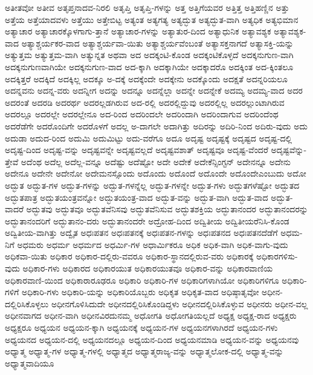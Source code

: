 {ಅತೀತವೋ
ಅತೀವ
ಅತೃಪ್ತನಾದವ-ನಿರಲಿ
ಅತೃಪ್ತಿ
ಅತೃಪ್ತಿ-ಗಳನ್ನು
ಅತ್ತ
ಅತ್ತಿಗೆಯವರ
ಅತ್ತಿತ್ತ
ಅತ್ತಿಹಣ್ಣಿನ
ಅತ್ತು
ಅತ್ತೆಯ
ಅತ್ತೆಯಾದವಳು
ಅತ್ತೆಯು
ಅತ್ತೇಬಿಟ್ಟ
ಅತ್ಯಂತ
ಅತ್ಯಗತ್ಯ
ಅತ್ಯದ್ಭುತ
ಅತ್ಯದ್ಭುತ-ವಾಗಿ
ಅತ್ಯಧಿಕ
ಅತ್ಯಭಿಮಾನ
ಅತ್ಯಾಚಾರ
ಅತ್ಯಾಚಾರಕ್ಕೊಳಗಾಗು-ತ್ತಾನೆ
ಅತ್ಯಾಚಾರ-ಗಳನ್ನು
ಅತ್ಯಾತುರ-ದಿಂದ
ಅತ್ಯಾಧುನಿಕ
ಅತ್ಯಾವಶ್ಯಕ
ಅತ್ಯಾವಶ್ಯಕ-ವಾದ
ಅತ್ಯಾಶ್ಚರ್ಯಕರ-ವಾದ
ಅತ್ಯಾಶ್ಚರ್ಯವಾ-ಯಿತು
ಅತ್ಯಾಶ್ಚರ್ಯವೆಂಬಂತೆ
ಅತ್ಯಾಸಕ್ತನಾಗದೆ
ಅತ್ಯಾಸಕ್ತಿ-ಯನ್ನು
ಅತ್ಯುತ್ತಮ
ಅತ್ಯುತ್ತಮ-ವಾಗಿ
ಅತ್ಯುನ್ನತ
ಅಥವಾ
ಅದ
ಅದಕ್ಕಂಟಿ-ಕೊಂಡ
ಅದಕ್ಕಂಟಿಕೊಳ್ಳದೆ
ಅದಕ್ಕನುಗುಣ-ವಾಗಿ
ಅದಕ್ಕನುಗುಣವಾಗಿಯೇ
ಅದಕ್ಕನುಗುಣ-ವಾದ
ಅದ-ಕ್ಕಾಗಿ
ಅದಕ್ಕಾಗಿಯೇ
ಅದಕ್ಕಾದರೊ
ಅದಕ್ಕಿಂತ
ಅದ-ಕ್ಕಿಂತಲೂ
ಅದಕ್ಕಿತ್ತರೆ
ಅದಕ್ಕಿದೆ
ಅದಕ್ಕಿಲ್ಲ
ಅದಕ್ಕೂ
ಅ-ದಕ್ಕೆ
ಅದಕ್ಕೆಂದೇ
ಅದಕ್ಕೇನು
ಅದಕ್ಕೊಂದು
ಅದಕ್ಷತೆ
ಅದನ್ನರಿಯಲೂ
ಅದನ್ನವನು
ಅದನ್ನ-ವರು
ಅದನ್ನೀಗ
ಅದನ್ನು
ಅದನ್ನೂ
ಅದನ್ನೆಲ್ಲಾ
ಅದನ್ನೇ
ಅದನ್ನೇಕೆ
ಅದಮ್ಯ
ಅದಮ್ಯ-ವಾದ
ಅದರ
ಅದರಂತೆ
ಅದರಡಿ
ಅದರರ್ಥ
ಅದರಲ್ಲಡಗಿರುವ
ಅದ-ರಲ್ಲಿ
ಅದರಲ್ಲಿದ್ದುವು
ಅದರಲ್ಲಿಲ್ಲ
ಅದರಲ್ಲುಂಟಾಗಿರುವ
ಅದರಲ್ಲೂ
ಅದರಲ್ಲೇ
ಅದರಲ್ಲೇನೂ
ಅದ-ರಿಂದ
ಅದರಿಂದಲೇ
ಅದರಿಂದಾಗಿ
ಅದರಿಂದಾಗುವ
ಅದರಿಂದೆಂಥ
ಅದರೆಡೆಗೇ
ಅದರೊಂದಿಗೇ
ಅದರೊಳಗೆ
ಅದಲ್ಲ
ಅ-ದಾಗಲೇ
ಅದಾಗಿತ್ತು
ಅದಿರನ್ನು
ಅದಿರಿ-ನಿಂದ
ಅದಿರು-ವುದು
ಅದು
ಅದುಡಾ
ಅದುದ-ರಿಂದ
ಅದುಮಿ
ಅದುಮಿಟ್ಟು
ಅದು-ವರೆಗೂ
ಅದೂ
ಅದೃಷ್ಟ
ಅದೃಷ್ಟಕ್ಕೆ
ಅದೃಷ್ಟದ
ಅದೃಷ್ಟ-ದಲ್ಲಿ
ಅದೃಷ್ಟ-ದಿಂದ
ಅದೃಷ್ಟ-ವನ್ನು
ಅದೃಷ್ಟವನ್ನೇ
ಅದೃಷ್ಟವಲ್ಲದೆ
ಅದೃಷ್ಟವಶಾತ್
ಅದೃಷ್ಟವೂ
ಅದೃಷ್ಟ-ವೆಂದರೆ
ಅದೃಷ್ಟವೆನ್ನು-ತ್ತೇವೆ
ಅದೆಂಥ
ಅದೆಲ್ಲ
ಅದೆಲ್ಲ-ವನ್ನೂ
ಅದೆಷ್ಟು
ಅದೆಷ್ಟೋ
ಅದೇ
ಅದೇಕೆ
ಅದೇಕೆನ್ಸಿಂಗ್ಟನ್
ಅದೇನನ್ನೂ
ಅದೇನು
ಅದೇನೂ
ಅದೇನೇ
ಅದೇನೋ
ಅದೇಮನಸ್ಸೊಂದು
ಅದೊಂದು
ಅದೊಂದೆ
ಅದೊಂದೇ
ಅದೊಂದೇಎಂಬುದು
ಅದೋ
ಅದ್ಭುತ
ಅದ್ಭುತ-ಗಳ
ಅದ್ಭುತ-ಗಳನ್ನು
ಅದ್ಭುತ-ಗಳನ್ನೆಲ್ಲ
ಅದ್ಭುತ-ಗಳನ್ನೇ
ಅದ್ಭುತ-ಗಳು
ಅದ್ಭುತಗಳೆಷ್ಟೋ
ಅದ್ಭುತದ
ಅದ್ಭುತಪಾತ್ರ
ಅದ್ಭುತಯಂತ್ರವನ್ನೋ
ಅದ್ಭುತಯಂತ್ರ-ವಾದ
ಅದ್ಭುತ-ವನ್ನು
ಅದ್ಭುತ-ವಾಗಿ
ಅದ್ಭುತ-ವಾದ
ಅದ್ಭುತ-ವಾದರೆ
ಅದ್ಭುತವು
ಅದ್ಭುತವೂ
ಅದ್ಭುತವೆನಿಸವು
ಅದ್ಭುತವೆನಿಸುವ
ಅದ್ಭುತಶಕ್ತಿಯ
ಅದ್ಭುತಾನಂದರ
ಅದ್ಭುತಾನಂದರನ್ನು
ಅದ್ಭುತಾನಂದರಿಗೆ
ಅದ್ಭುತಾನಂ-ದರು
ಅದ್ಭುತಾನಂದರೇ
ಅದ್ರೋಹ-ದಿಂದ
ಅದ್ವಿತೀಯ
ಅದ್ವಿತೀಯರೆನಿಸಿ-ಕೊಂಡ
ಅದ್ವಿತೀಯ-ವಾಗಿತ್ತು
ಅದ್ವೈತ
ಅಧಃಪತನ
ಅಧಃಪತನಕ್ಕೆ
ಅಧಃಪತನ-ಗಳನ್ನು
ಅಧಃಪತನದ
ಅಧಃಪತನದೆಡೆಗೆ
ಅಧಮ-ನಿಗೆ
ಅಧಮರು
ಅಧರ್ಮ
ಅಧರ್ಮದ
ಅಧರ್ಮಿ-ಗಳ
ಅಧಾರ್ಮಿಕರೂ
ಅಧಿಕ
ಅಧಿಕ-ವಾಗಿ
ಅಧಿಕ-ವಾಗು-ವುದು
ಅಧಿಕವಾ-ಯಿತು
ಅಧಿಕಾರ
ಅಧಿಕಾರ-ದಲ್ಲಿರು-ವವರೂ
ಅಧಿಕಾರ-ಸ್ಥಾನದಲ್ಲಿರುವ-ವರು
ಅಧಿಕಾರಕ್ಕೆ
ಅಧಿಕಾರಗಳಿಸು-ವುದು
ಅಧಿಕಾರ-ಗಳು
ಅಧಿಕಾರದ
ಅಧಿಕಾರಯುತ
ಅಧಿಕಾರಯುತವೂ
ಅಧಿಕಾರ-ವನ್ನು
ಅಧಿಕಾರವಾಣಿಯ
ಅಧಿಕಾರವಾಣಿ-ಯಿಂದ
ಅಧಿಕಾರಾರೂಢರೂ
ಅಧಿಕಾರಿ
ಅಧಿಕಾರಿ-ಗಳ
ಅಧಿಕಾರಿಗಳಾಗಿಯೋ
ಅಧಿಕಾರಿಗಳಿಗೂ
ಅಧಿಕಾರಿ-ಗಳಿಗೆ
ಅಧಿಕಾರಿ-ಗಳು
ಅಧಿಕಾರಿ-ಯನ್ನು
ಅಧಿಕಾರಿಯೊಬ್ಬರು
ಅಧಿಕೃತ
ಅಧಿಕೃತ-ವಾದ
ಅಧಿಷ್ಠಾತೃವೋ
ಅಧೀನ-ದಲ್ಲಿರಿಸಿಕೊಳ್ಳಲು
ಅಧೀನಗೊಳಿಸಿದುದೇ
ಅಧೀನದಲ್ಲಿರಿಸಿಕೊಂಡಿದ್ದಳು
ಅಧೀನದಲ್ಲಿರಿಸಿಕೊಳ್ಳುವ
ಅಧೀನರು
ಅಧೀನ-ವಲ್ಲ
ಅಧೀನವಾಗದ
ಅಧೀನ-ವಾಗಿ
ಅಧೀನವಿರದುನಮ್ಮ
ಅಧೋಗತಿ
ಅಧೋಗತಿಯಲ್ಲದೆ
ಅಧ್ಯಕ್ಷ
ಅಧ್ಯಕ್ಷ-ರಾದ
ಅಧ್ಯಕ್ಷರು
ಅಧ್ಯಕ್ಷರೂ
ಅಧ್ಯಯನ
ಅಧ್ಯಯನ-ಕ್ಕಾಗಿ
ಅಧ್ಯಯನಕ್ಕೆ
ಅಧ್ಯಯನ-ಗಳ
ಅಧ್ಯಯನಗಳಾಗಿರದೆ
ಅಧ್ಯಯನ-ಗಳು
ಅಧ್ಯಯನದ
ಅಧ್ಯಯನ-ದಲ್ಲಿ
ಅಧ್ಯಯನದಲ್ಲೂ
ಅಧ್ಯಯನ-ದಿಂದ
ಅಧ್ಯಯನಮಾಡಿ
ಅಧ್ಯಯನ-ವನ್ನು
ಅಧ್ಯಯನವು
ಅಧ್ಯಾತ್ಮ
ಅಧ್ಯಾತ್ಮ-ಗಳ
ಅಧ್ಯಾತ್ಮ-ಗಳಲ್ಲಿ
ಅಧ್ಯಾತ್ಮದ
ಅಧ್ಯಾತ್ಮರಾಜ್ಯ-ವನ್ನು
ಅಧ್ಯಾತ್ಮಲೋಕ-ದಲ್ಲಿ
ಅಧ್ಯಾತ್ಮ-ವನ್ನು
ಅಧ್ಯಾತ್ಮವಾದಿಯೂ
}
